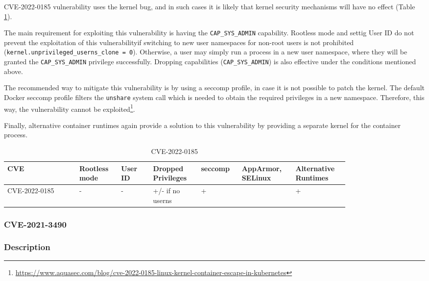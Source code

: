 CVE-2022-0185 vulnerability uses the kernel bug, and in such cases it is likely that kernel security mechanisms will have no effect (Table \ref*{tab:h:3}).

The main requirement for exploiting this vulnerability is having the  \texttt{CAP\_SYS\_ADMIN} capability. Rootless mode and settig User ID do not prevent the exploitation of this vulnerabilityif switching to new user namespaces for non-root users is not prohibited \linebreak (\texttt{kernel.unprivileged\_userns\_clone = 0}). Otherwise, a user may simply run a process in a new user namespace, where they will be granted the \texttt{CAP\_SYS\_ADMIN} privilege successfully. Dropping capabilities (\texttt{CAP\_SYS\_ADMIN}) is also effective under the conditions mentioned above.

The recommended way to mitigate this vulnerability is by using a seccomp profile, in case it is not possible to patch the kernel. The default Docker seccomp profile filters the \texttt{unshare} system call which is needed to obtain the required privileges in a new namespace. Therefore, this way, the vulnerability cannot be exploited\footnote{\url{https://www.aquasec.com/blog/cve-2022-0185-linux-kernel-container-escape-in-kubernetes}}.

Finally, alternative container runtimes again provide a solution to this vulnerability by providing a separate kernel for the container process.

\begin{table}[H]
    \centering \small
    \begin{tabular}{| p{0.18\linewidth} | p{0.1\linewidth} | p{0.08\linewidth} | p{0.12\linewidth} | p{0.09\linewidth} | p{0.12\linewidth} | p{0.12\linewidth} |} \hline
    CVE & Rootless mode & User ID & Dropped Privileges & seccomp & AppArmor, SELinux & Alternative Runtimes \\ \hline
    CVE-2022-0185 & - & - & \cellcolor{yellow!25} +/- \linebreak if no userns & \cellcolor{green!25} + &  & \cellcolor{green!25} + \\ \hline
    \end{tabular}
    \caption{CVE-2022-0185}
    \label{tab:h:3}
\end{table}


\subsubsection{CVE-2021-3490}
\subsubsection*{Description}

